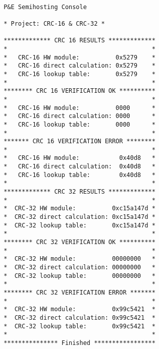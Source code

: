 \documentclass[11pt,a4paper]{article}
\begin{document}
\begin{verbatim}

                    P&E Semihosting Console

                    * Project: CRC-16 & CRC-32 *

                    ************* CRC 16 RESULTS *************
                    *                                        *
                    *   CRC-16 HW module:          0x5279    *
                    *   CRC-16 direct calculation: 0x5279    *
                    *   CRC-16 lookup table:       0x5279    *
                    *                                        *
                    ******** CRC 16 VERIFICATION OK **********
                    *                                        *
                    *   CRC-16 HW module:          0000      *
                    *   CRC-16 direct calculation: 0000      *
                    *   CRC-16 lookup table:       0000      *
                    *                                        *
                    ******* CRC 16 VERIFICATION ERROR ********
                    *                                        *
                    *   CRC-16 HW module:           0x40d8   *
                    *   CRC-16 direct calculation:  0x40d8   *
                    *   CRC-16 lookup table:        0x40d8   *
                    *                                        *
                    ************* CRC 32 RESULTS *************
                    *                                        *
                    *  CRC-32 HW module:          0xc15a147d *
                    *  CRC-32 direct calculation: 0xc15a147d *
                    *  CRC-32 lookup table:       0xc15a147d *
                    *                                        *
                    ******** CRC 32 VERIFICATION OK **********
                    *                                        *
                    *  CRC-32 HW module:          00000000   *
                    *  CRC-32 direct calculation: 00000000   *
                    *  CRC-32 lookup table:       00000000   *
                    *                                        *
                    ******** CRC 32 VERIFICATION ERROR *******
                    *                                        *
                    *  CRC-32 HW module:          0x99c5421  *
                    *  CRC-32 direct calculation: 0x99c5421  *
                    *  CRC-32 lookup table:       0x99c5421  *
                    *                                        *
                    *************** Finished *****************

\end{verbatim}
\end{document}
